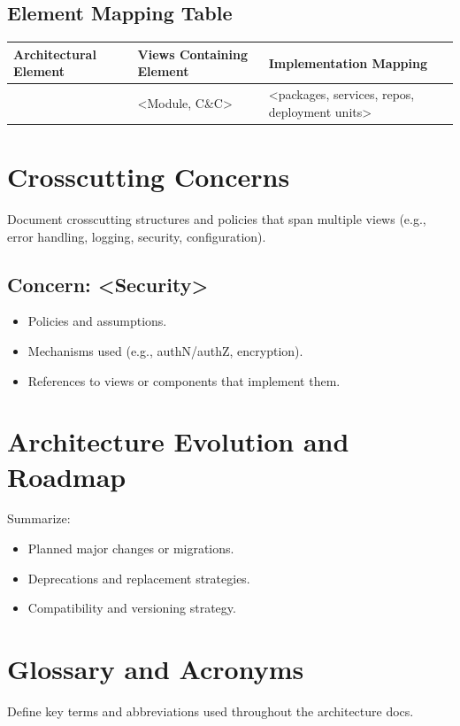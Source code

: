 \documentclass[11pt]{article}
\begin{document}
\subsection*{Element Mapping Table}
\begin{longtable}{>{\bfseries}p{} p{} p{}}
Architectural Element & Views Containing Element & Implementation Mapping \\
\hline
<Element ID> & <Module, C\&C> & <packages, services, repos, deployment units> \\
\end{longtable}

\section{Crosscutting Concerns}
Document crosscutting structures and policies that span multiple views
(e.g., error handling, logging, security, configuration).

\subsection*{Concern: <Security>}
\begin{itemize}
  \item Policies and assumptions.
  \item Mechanisms used (e.g., authN/authZ, encryption).
  \item References to views or components that implement them.
\end{itemize}


\section{Architecture Evolution and Roadmap}
Summarize:
\begin{itemize}
  \item Planned major changes or migrations.
  \item Deprecations and replacement strategies.
  \item Compatibility and versioning strategy.
\end{itemize}

\section{Glossary and Acronyms}
Define key terms and abbreviations used throughout the architecture docs.
\end{document}
